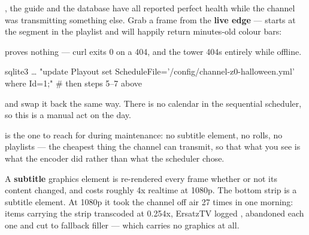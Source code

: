 \documentclass[fontpath=fonts/,logopath=logo/]{riposte-doc}
\begin{document}

, the guide and the database have all reported perfect health while the channel was transmitting something else. Grab a frame from the \textbf{live edge} —  starts at the  segment in the playlist and will happily return minutes-old colour bars:

\ripcodeopen
{}
\ripcodesizereset\ripcodeclose

 proves nothing — curl exits 0 on a 404, and the tower 404s  entirely while offline.



\ripcodeopen
{}
\begin{ripcodeblock}
sqlite3 … "update Playout set ScheduleFile='/config/channel-z0-halloween.yml' where Id=1;"
# then steps 5–7 above
\end{ripcodeblock}
\ripcodesizereset\ripcodeclose

and swap it back the same way. There is no calendar in the sequential scheduler, so this is a manual act on the day.

 is the one to reach for during maintenance: no subtitle element, no rolls, no playlists — the cheapest thing the channel can transmit, so that what you see is what the encoder did rather than what the scheduler chose.



A \textbf{subtitle} graphics element is re-rendered every frame whether or not its content changed, and costs roughly 4x realtime at 1080p. The bottom strip is a subtitle element. At 1080p it took the channel off air 27 times in one morning: items carrying the strip transcoded at 0.254x, ErsatzTV logged , abandoned each one and cut to fallback filler — which carries no graphics at all.
\end{document}
